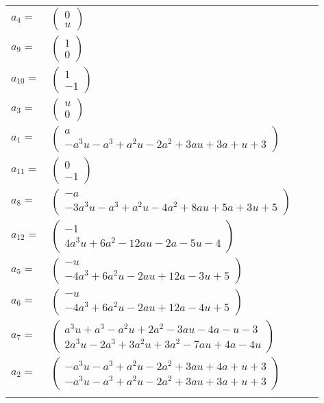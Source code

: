 \documentclass[1p]{elsarticle_modified}
\theoremstyle{definition}
\begin{document}
\begin{tabular}{m{7pt} m{180pt} m{7pt} m{180pt} }
\flushright $a_{4}=$&$\begin{pmatrix}0\\u\end{pmatrix}$ \\
\flushright $a_{9}=$&$\begin{pmatrix}1\\0\end{pmatrix}$ \\
\flushright $a_{10}=$&$\begin{pmatrix}1\\-1\end{pmatrix}$ \\
\flushright $a_{3}=$&$\begin{pmatrix}u\\0\end{pmatrix}$ \\
\flushright $a_{1}=$&$\begin{pmatrix}a\\- a^3 u- a^3+a^2 u-2 a^2+3 a u+3 a+u+3\end{pmatrix}$ \\
\flushright $a_{11}=$&$\begin{pmatrix}0\\-1\end{pmatrix}$ \\
\flushright $a_{8}=$&$\begin{pmatrix}- a\\-3 a^3 u- a^3+a^2 u-4 a^2+8 a u+5 a+3 u+5\end{pmatrix}$ \\
\flushright $a_{12}=$&$\begin{pmatrix}-1\\4 a^3 u+6 a^2-12 a u-2 a-5 u-4\end{pmatrix}$ \\
\flushright $a_{5}=$&$\begin{pmatrix}- u\\-4 a^3+6 a^2 u-2 a u+12 a-3 u+5\end{pmatrix}$ \\
\flushright $a_{6}=$&$\begin{pmatrix}- u\\-4 a^3+6 a^2 u-2 a u+12 a-4 u+5\end{pmatrix}$ \\
\flushright $a_{7}=$&$\begin{pmatrix}a^3 u+a^3- a^2 u+2 a^2-3 a u-4 a- u-3\\2 a^3 u-2 a^3+3 a^2 u+3 a^2-7 a u+4 a-4 u\end{pmatrix}$ \\
\flushright $a_{2}=$&$\begin{pmatrix}- a^3 u- a^3+a^2 u-2 a^2+3 a u+4 a+u+3\\- a^3 u- a^3+a^2 u-2 a^2+3 a u+3 a+u+3\end{pmatrix}$\\&\end{tabular}
\end{document}
